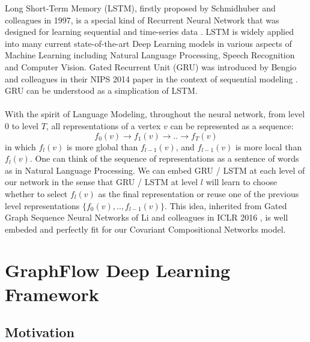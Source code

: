 \documentclass[a4paper]{article}
\begin{document}
Long Short-Term Memory (LSTM), firstly proposed by Schmidhuber and colleagues in 1997, is a special kind of Recurrent Neural Network that was designed for learning sequential and time-series data \cite{Hochreiter}. LSTM is widely applied into many current state-of-the-art Deep Learning models in various aspects of Machine Learning including Natural Language Processing, Speech Recognition and Computer Vision. Gated Recurrent Unit (GRU) was introduced by Bengio and colleagues in their NIPS 2014 paper in the context of sequential modeling \cite{Chung}. GRU can be understood as a simplication of LSTM. \\ \\
With the spirit of Language Modeling, throughout the neural network, from level $0$ to level $T$, all representations of a vertex $v$ can be represented as a sequence:
$$f_0(v) \rightarrow f_1(v) \rightarrow .. \rightarrow f_T(v)$$
in which $f_l(v)$ is more global than $f_{l - 1}(v)$, and $f_{l - 1}(v)$ is more local than $f_l(v)$. One can think of the sequence of representations as a sentence of words as in Natural Language Processing. We can embed GRU / LSTM at each level of our network in the sense that GRU / LSTM at level $l$ will learn to choose whether to select $f_l(v)$ as the final representation or reuse one of the previous level representations $\{f_0(v), .., f_{l - 1}(v)\}$. This idea, inherited from Gated Graph Sequence Neural Networks of Li and colleagues in ICLR 2016 \cite{Li}, is well embeded and perfectly fit for our Covariant Compositional Networks model.

\section{GraphFlow Deep Learning Framework}

\subsection{Motivation}
\end{document}

